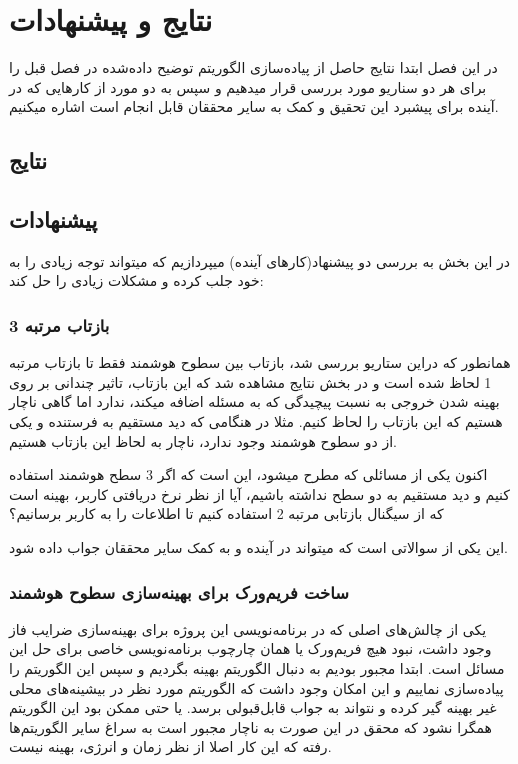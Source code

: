 \chapter{نتایج و پیشنهادات}
در این فصل ابتدا نتایج حاصل از پیاده‌سازی الگوریتم توضیح داده‌شده در فصل قبل را برای هر دو سناریو مورد بررسی قرار میدهیم و سپس به دو مورد از کارهایی که در آینده برای پیشبرد این تحقیق و کمک به سایر محققان قابل انجام است اشاره میکنیم.
\newpage
\section{نتایج}

\section{پیشنهادات}

در این بخش به بررسی دو پیشنهاد(کارهای آینده) میپردازیم که میتواند توجه زیادی را به خود جلب کرده و مشکلات زیادی را حل کند:

\subsection{بازتاب مرتبه 3}

همانطور که دراین ستاریو بررسی شد، بازتاب بین سطوح هوشمند فقط تا بازتاب مرتبه 1 لحاظ شده است و در بخش نتایج مشاهده شد که این بازتاب، تاثیر چندانی بر روی بهینه شدن خروجی به نسبت پیچیدگی که به مسئله اضافه میکند، ندارد اما گاهی ناچار هستیم که این بازتاب را لحاظ کنیم. مثلا در هنگامی که دید مستقیم به فرستنده و یکی از دو سطوح هوشمند وجود ندارد، ناچار به لحاظ این بازتاب هستیم. 

اکنون یکی از مسائلی که مطرح میشود، این است که اگر 3 سطح هوشمند استفاده کنیم و دید مستقیم به دو سطح نداشته باشیم، آیا از نظر  نرخ دریافتی کاربر، بهینه است که از سیگنال بازتابی مرتبه 2 استفاده کنیم تا اطلاعات را به کاربر برسانیم؟

این یکی از سوالاتی است که میتواند در آینده و به کمک سایر محققان جواب داده شود. 

\subsection{ساخت فریم‌ورک برای بهینه‌سازی سطوح هوشمند}

یکی از چالش‌های اصلی که در برنامه‌نویسی این پروژه برای بهینه‌سازی ضرایب فاز وجود داشت، نبود هیچ فریم‌ورک یا همان چارچوب برنامه‌نویسی خاصی برای حل این مسائل است. ابتدا مجبور بودیم به دنبال الگوریتم بهینه بگردیم و سپس این الگوریتم را پیاده‌سازی نماییم و این امکان وجود داشت که الگوریتم مورد نظر در بیشینه‌های محلی غیر بهینه گیر کرده و نتواند به جواب قابل‌قبولی برسد. یا حتی ممکن بود این الگوریتم همگرا نشود که محقق در این صورت به ناچار مجبور است به سراغ سایر الگوریتم‌ها رفته که این کار اصلا از نظر زمان و انرژی، بهینه نیست.

